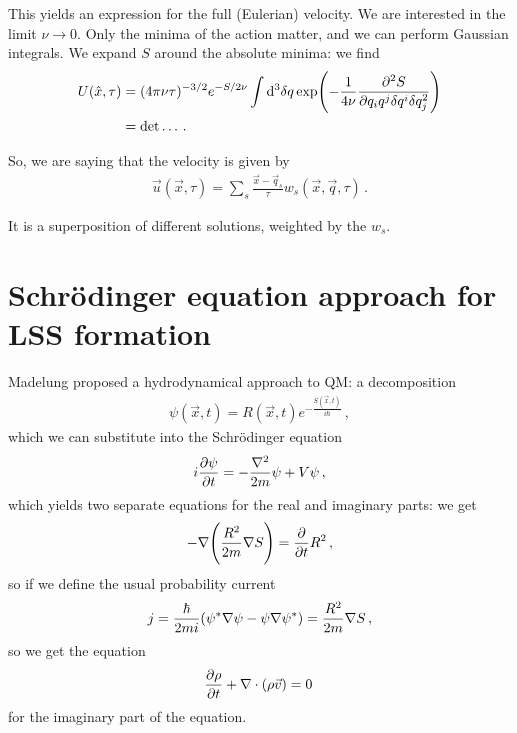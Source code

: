 \documentclass[main.tex]{subfiles}
\begin{document}
This yields an expression for the full (Eulerian) velocity. 
We are interested in the limit \(\nu \to 0 \). Only the minima of the action matter, and we can perform Gaussian integrals. We expand \(S\) around the absolute minima: we find 
%
\begin{subequations}
\begin{align}
U(\hat{x}, \tau ) &= (4 \pi \nu \tau )^{-3/2} e^{-S / 2 \nu }
\int \dd[3]{ \delta q} \exp(- \frac{1}{4 \nu } \pdv[2]{S}{q_{i} q^{j} \delta q^{i} \delta q_{j}})  \\
&= \det \dots
\,.
\end{align}
\end{subequations}

So, we are saying that the velocity is given by 
%
\begin{align}
\vec{u} (\vec{x}, \tau ) = \sum _{s} \frac{\vec{x} - \vec{q}_{s}}{\tau } w_{s} (\vec{x}, \vec{q}, \tau )
\,.
\end{align}

It is a superposition of different solutions, weighted by the \(w_{s}\).

\section{Schrödinger equation approach for LSS formation}

Madelung proposed a hydrodynamical approach to QM: a decomposition 
%
\begin{align}
\psi (\vec{x}, t) = R (\vec{x}, t) e^{- \frac{S(\vec{x},t)}{i \hbar}}
\,,
\end{align}
%
which we can substitute into the Schrödinger equation 
%
\begin{align}
i \pdv{\psi }{t} = - \frac{\nabla^2}{2m} \psi + V \psi 
\,,
\end{align}
%
which yields two separate equations for the real and imaginary parts: we get 
%
\begin{align}
- \nabla \qty( \frac{R^2}{2m} \nabla S) = \pdv{}{t} R^2
\,,
\end{align}
%
so if we define the usual probability current 
%
\begin{align}
j = \frac{\hbar}{2 m i} \qty(\psi^{*} \nabla \psi - \psi \nabla \psi^{*}) = \frac{R^2}{2m} \nabla S
\,,
\end{align}
%
so we get the equation 
%
\begin{align}
\pdv{\rho }{t} + \nabla \cdot \qty(\rho \vec{v}) = 0
\,
\end{align}
%
for the imaginary part of the equation. 
\end{document}
